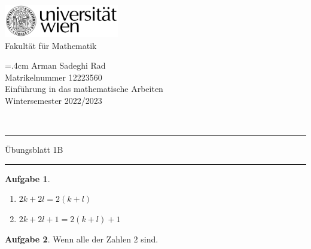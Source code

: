 \documentclass{article}
\theoremstyle{definition}
\newtheorem{ub}{Aufgabe}
\begin{document}
	
	\thispagestyle{plain}
	\begin{minipage}{5cm}
		\includegraphics[width=5cm]{logo}\\
		\centering
		Fakultät für Mathematik
	\end{minipage}
	\hfill
	\begin{minipage}{7cm}
		\baselineskip=.4cm
		Arman Sadeghi Rad\\
		Matrikelnummer 12223560 \\
		Einführung in das mathematische Arbeiten \\
		Wintersemester 2022/2023
	\end{minipage}\\[1mm]
	\hrule height2pt \vskip1mm
	\noindent
	Übungsblatt 1B
	\hrule height2pt \vskip1mm
\begin{tcolorbox}
	\begin{ub}
		\begin{enumerate}
			\item $ 2k + 2l = 2(k+l) $
			\item $ 2k + 2l + 1 = 2(k+l) + 1 $
		\end{enumerate}
	\end{ub}
	\begin{ub}
		Wenn alle der Zahlen $ 2 $ sind.
	\end{ub}
\end{tcolorbox}
\end{document}
